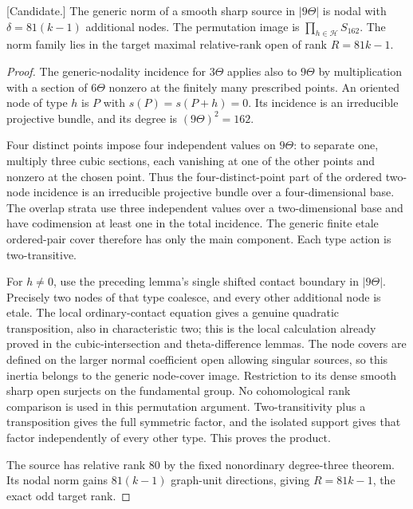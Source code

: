 \begin{lemma}
\label{lem:nine-theta-node-product-candidate}
\textup{[Candidate.]}
The generic norm of a smooth sharp source in $|9\Theta|$ is nodal
with $\delta=81(k-1)$ additional nodes. The permutation image is
$\prod_{h\in\mathcal H}S_{162}$. The norm family lies in the
target maximal relative-rank open of rank $R=81k-1$.
\end{lemma}

\begin{proof}
The generic-nodality incidence for $3\Theta$ applies also to
$9\Theta$ by multiplication with a section of $6\Theta$ nonzero
at the finitely many prescribed points. An oriented node of type
$h$ is $P$ with $s(P)=s(P+h)=0$. Its incidence is an irreducible
projective bundle, and its degree is $(9\Theta)^2=162$.

Four distinct points impose four independent values on $9\Theta$:
to separate one, multiply three cubic sections, each vanishing
at one of the other points and nonzero at the chosen point.
Thus the four-distinct-point part of the ordered two-node
incidence is an irreducible projective bundle over a four-dimensional
base. The overlap strata use three independent values over a
two-dimensional base and have codimension at least one in the
total incidence. The generic finite etale ordered-pair cover
therefore has only the main component. Each type action is
two-transitive.

For $h\ne0$, use the preceding lemma's single shifted contact
boundary in $|9\Theta|$. Precisely two nodes of that type
coalesce, and every other additional node is etale. The local
ordinary-contact equation gives a genuine quadratic transposition,
also in characteristic two; this is the local calculation already
proved in the cubic-intersection and theta-difference lemmas.
The node covers are defined on the larger normal coefficient
open allowing singular sources, so this inertia belongs to the
generic node-cover image. Restriction to its dense smooth sharp
open surjects on the fundamental group. No cohomological rank
comparison is used in this permutation argument.
Two-transitivity plus a transposition gives the full symmetric
factor, and the isolated support gives that factor independently
of every other type. This proves the product.

The source has relative rank $80$ by the fixed nonordinary
degree-three theorem. Its nodal norm gains $81(k-1)$ graph-unit
directions, giving $R=81k-1$, the exact odd target rank.
\end{proof}

